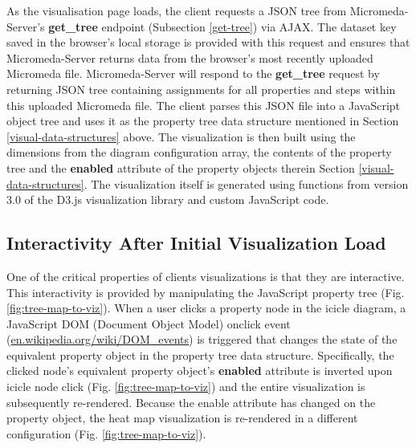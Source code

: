 As the visualisation page loads, the client requests a JSON tree from Micromeda-Server's \textbf{get\_tree} endpoint (Subsection \ref{get-tree}) via AJAX. The dataset key saved in the browser's local storage is provided with this request and ensures that Micromeda-Server returns data from the browser's most recently uploaded Micromeda file. Micromeda-Server will respond to the \textbf{get\_tree} request by returning JSON tree containing assignments for all properties and steps within this uploaded Micromeda file. The client parses this JSON file into a JavaScript object tree and uses it as the property tree data structure mentioned in Section \ref{visual-data-structures} above. The visualization is then built using the dimensions from the diagram configuration array, the contents of the property tree and the \textbf{enabled} attribute of the property objects therein Section \ref{visual-data-structures}. The visualization itself is generated using functions from version 3.0 of the D3.js visualization library \cite{bostock2015d3} and custom JavaScript code.

\subsection{Interactivity After Initial Visualization Load}

One of the critical properties of clients visualizations is that they are interactive. This interactivity is provided by manipulating the JavaScript property tree (Fig. \ref{fig:tree-map-to-viz}). When a user clicks a property node in the icicle diagram, a JavaScript DOM (Document Object Model) onclick event \cite{dom-events} (\href{en.wikipedia.org/wiki/DOM\_events}{en.wikipedia.org/wiki/DOM\_events}) is triggered that changes the state of the equivalent property object in the property tree data structure. Specifically, the clicked node's equivalent property object's \textbf{enabled} attribute is inverted upon icicle node click (Fig. \ref{fig:tree-map-to-viz}) and the entire visualization is subsequently re-rendered. Because the enable attribute has changed on the property object, the heat map visualization is re-rendered in a different configuration (Fig. \ref{fig:tree-map-to-viz}). 

